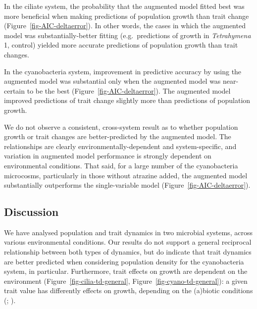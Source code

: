 \documentclass[
  letterpaper,
  DIV=11,
  numbers=noendperiod]{scrartcl}
\begin{document}
In the ciliate system, the probability that the augmented model fitted
best was more beneficial when making predictions of population growth
than trait change (Figure~\ref{fig-AIC-deltaerror}). In other words, the
cases in which the augmented model was substantially-better fitting
(e.g.~predictions of growth in \emph{Tetrahymena} 1, control) yielded
more accurate predictions of population growth than trait changes.

In the cyanobacteria system, improvement in predictive accuracy by using
the augmented model was substantial only when the augmented model was
near-certain to be the best (Figure~\ref{fig-AIC-deltaerror}). The
augmented model improved predictions of trait change slightly more than
predictions of population growth.

We do not observe a consistent, cross-system result as to whether
population growth or trait changes are better-predicted by the augmented
model. The relationships are clearly environmentally-dependent and
system-specific, and variation in augmented model performance is
strongly dependent on environmental conditions. That said, for a large
number of the cyanobacteria microcosms, particularly in those without
atrazine added, the augmented model substantially outperforms the
single-variable model (Figure~\ref{fig-AIC-deltaerror}).

\subsection{Discussion}\label{sec-DAE_discussion}

We have analysed population and trait dynamics in two microbial systems,
across various environmental conditions. Our results do not support a
general reciprocal relationship between both types of dynamics, but do
indicate that trait dynamics are better predicted when considering
population density for the cyanobacteria system, in particular.
Furthermore, trait effects on growth are dependent on the environment
(Figure~\ref{fig-cilia-td-general}, Figure~\ref{fig-cyano-td-general}):
a given trait value has differently effects on growth, depending on the
(a)biotic conditions (;
).
\end{document}
